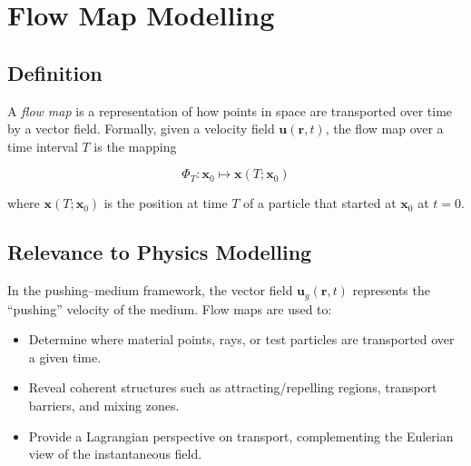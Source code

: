\documentclass{article}
\begin{document}
\section*{Flow Map Modelling}

\subsection*{Definition}
A \emph{flow map} is a representation of how points in space are transported over time by a vector field.  
Formally, given a velocity field $\mathbf{u}(\mathbf{r},t)$, the flow map over a time interval $T$ is the mapping

\[
\Phi_T : \mathbf{x}_0 \mapsto \mathbf{x}(T; \mathbf{x}_0)
\]

where $\mathbf{x}(T; \mathbf{x}_0)$ is the position at time $T$ of a particle that started at $\mathbf{x}_0$ at $t=0$.

\subsection*{Relevance to Physics Modelling}
In the pushing--medium framework, the vector field $\mathbf{u}_g(\mathbf{r},t)$ represents the ``pushing'' velocity of the medium.  
Flow maps are used to:
\begin{itemize}
    \item Determine where material points, rays, or test particles are transported over a given time.
    \item Reveal coherent structures such as attracting/repelling regions, transport barriers, and mixing zones.
    \item Provide a Lagrangian perspective on transport, complementing the Eulerian view of the instantaneous field.
\end{itemize}
\end{document}
